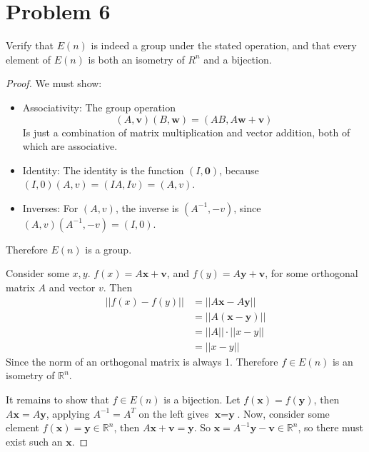 \documentclass[a4paper,12pt]{extarticle}
\theoremstyle{definition}
\newcommand{\R}{\mathbb{R}} \newcommand{\Q}{\mathbb{Q}} \newcommand{\Z}{\mathbb{Z}} \newcommand{\N}{\mathbb{N}} \newcommand{\myskip}{\par\null\par} \renewcommand\qedsymbol{QED} \renewcommand{\leq}{\leqslant}\renewcommand{\geq}{\geqslant}
\begin{document}
        \section*{Problem 6}
        Verify that $E(n)$ is indeed a group under the stated operation, and that every element of $E(n)$ is both an isometry of $R^n$ and a bijection.\begin{proof}
        We must show: \begin{itemize}
            \item Associativity: The group operation $$(A,\textbf{v})(B,\textbf{w})=(AB,A\textbf{w}+\textbf{v})$$ Is just a combination of matrix multiplication and vector addition, both of which are associative.
            \item Identity: The identity is the function $(I,\textbf{0})$, because $(I,0)(A,v)=(IA,Iv)=(A,v)$.
            \item Inverses: For $(A,v)$, the inverse is $(A^{-1},-v)$, since $(A,v)(A^{-1},-v)=(I,0)$.
        \end{itemize} Therefore $E(n)$ is a group.\myskip Consider some $x,y$. $f(x)=A\textbf{x}+\textbf{v}$, and $f(y)=A\textbf{y}+\textbf{v}$, for some orthogonal matrix $A$ and vector $v$. Then \begin{align*}
            ||f(x)-f(y)||&=||A\textbf{x}-A\textbf{y}||\\
            &=||A(\textbf{x}-\textbf{y})||\\
            &=||A||\cdot||x-y||\\
            &=||x-y||
        \end{align*} Since the norm of an orthogonal matrix is always 1. Therefore $f\in E(n)$ is an isometry of $\R^n$.\myskip It remains to show that $f\in E(n)$ is a bijection. Let $f(\textbf{x})=f(\textbf{y})$, then $A\textbf{x}=A\textbf{y}$, applying $A^{-1}=A^T$ on the left gives $\textbf{x}=\textbf{y}$. Now, consider some element $f(\textbf{x})=\textbf{y}\in\R^n$, then $A\textbf{x}+\textbf{v}=\textbf{y}$. So $\textbf{x}=A^{-1}\textbf{y}-\textbf{v}\in\R^n$, so there must exist such an $\textbf{x}$.
        \end{proof}
\end{document}
